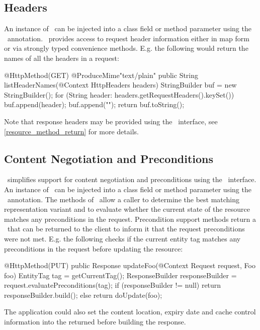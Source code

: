 \subsection{Headers}

An instance of \HttpHeaders\ can be injected into a class field or method parameter using the \Context\ annotation. \HttpHeaders\ provides access to request header information either in map form or via strongly typed convenience methods. E.g. the following would return the names of all the headers in a request:

\begin{listing}{1}
@HttpMethod(GET)
@ProduceMime{"text/plain"}
public String listHeaderNames(@Context HttpHeaders headers) {
  StringBuilder buf = new StringBuilder();
  for (String header: headers.getRequestHeaders().keySet()) {
    buf.append(header);
    buf.append("\n");
  }
  return buf.toString();
}
\end{listing}

Note that response headers may be provided using the \Response\ interface, see \ref{resource_method_return} for more details.

\subsection{Content Negotiation and Preconditions}

\jaxrs\ simplifies support for content negotiation and preconditions using the \Request\ interface. An instance of \Request\ can be injected into a class field or method parameter using the \Context\ annotation. The methods of \Request\ allow a caller to determine the best matching representation variant and to evaluate whether the current state of the resource matches any preconditions in the request. Precondition support methods return a \ResponseBuilder\ that can be returned to the client to inform it that the request preconditions were not met. E.g. the following checks if the current entity tag matches any preconditions in the request before updating the resource:

\begin{listing}{1}
@HttpMethod(PUT)
public Response updateFoo(@Context Request request, Foo foo) {
	EntityTag tag = getCurrentTag();
	ResponseBuilder responseBuilder = request.evaluatePreconditions(tag);
	if (responseBuilder != null)
	  return responseBuilder.build();
	else
	  return doUpdate(foo);
}
\end{listing}


The application could also set the content location, expiry date and cache control information into the returned  before building the response.

